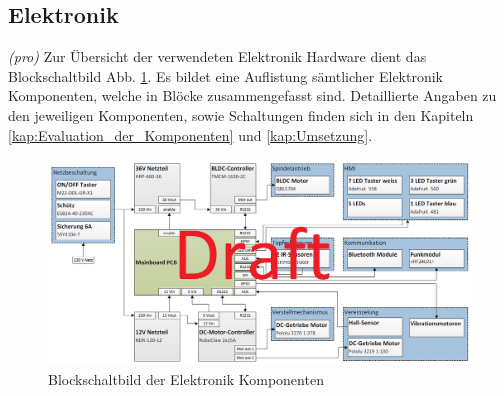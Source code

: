 \subsection{Elektronik}
\textit{(pro)} Zur Übersicht der verwendeten Elektronik Hardware dient das Blockschaltbild Abb. \ref{fig:Blockschaltbild_Komponenten}. Es bildet eine Auflistung sämtlicher Elektronik Komponenten, welche in Blöcke zusammengefasst sind. Detaillierte Angaben zu den jeweiligen Komponenten, sowie Schaltungen finden sich in den Kapiteln \ref{kap:Evaluation_der_Komponenten} und \ref{kap:Umsetzung}. 


\begin{figure}[H]
	\includegraphics[width=1\textwidth]{Illustrationen/5-Konzept/Blockschaltbild_Komponenten.png}
	\caption{Blockschaltbild der Elektronik Komponenten}
	\label{fig:Blockschaltbild_Komponenten}
\end{figure}

